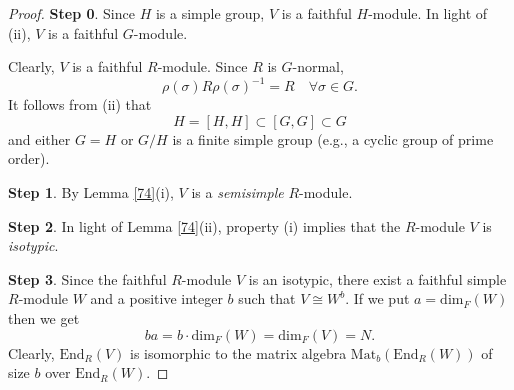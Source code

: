 \documentclass[12pt,a4paper,reqno]{amsart}
\def\End{\mathrm{End}}
\def\Mat{\mathrm{Mat}}
\def\dim{\mathrm{dim}}
\theoremstyle{definition}
\begin{document}
\begin{proof}
{\bf Step 0}.
Since $H$ is a simple group, $V$ is a faithful $H$-module. In light of (ii), $V$ is a faithful $G$-module.

Clearly, $V$ is a faithful $R$-module. Since $R$ is $G$-normal,
\begin{equation}
\label{NormalEq}
\rho(\sigma) R \rho(\sigma)^{-1} = R \quad
\forall \sigma \in G.  
\end{equation}
It follows from (ii) that 
$$H=[H,H]\subset [G,G]\subset G$$
and either $G=H$ or $G/H$ is a finite simple group (e.g., a cyclic group of prime order).

{\bf Step 1}. By Lemma \ref{74}(i), $V$ is a {\sl semisimple} $R$-module.

{\bf Step 2}.   In light of Lemma \ref{74}(ii), property (i) implies that
the $R$-module $V$ is {\sl isotypic}.


{\bf Step 3}. Since the faithful $R$-module $V$ is an isotypic, there exist a faithful simple
$R$-module $W$   and a positive integer $b$ such that $V \cong W^b$. If we put $a=\dim_F(W)$ then we get
    $$ba=b \cdot \dim_F(W)=\dim_F(V)=N.$$
Clearly, $\End_R(V)$ is isomorphic to the matrix algebra
$\Mat_b(\End_R(W))$  of size $b$ over $\End_R(W)$.


\end{proof}
\end{document}
